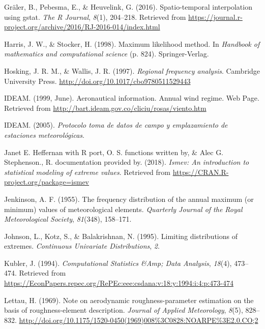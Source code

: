 \documentclass[12pt,oneside]{reedthesis}
\begin{document}
\leavevmode\hypertarget{ref-Graeler2016}{}%
Gräler, B., Pebesma, E., \& Heuvelink, G. (2016). Spatio-temporal interpolation using gstat. \emph{The R Journal}, \emph{8}(1), 204--218. Retrieved from \url{https://journal.r-project.org/archive/2016/RJ-2016-014/index.html}

\leavevmode\hypertarget{ref-Harris1994}{}%
Harris, J. W., \& Stocker, H. (1998). Maximum likelihood method. In \emph{Handbook of mathematics and computational science} (p. 824). Springer-Verlag.

\leavevmode\hypertarget{ref-Hosking1997}{}%
Hosking, J. R. M., \& Wallis, J. R. (1997). \emph{Regional frequency analysis}. Cambridge University Press. \url{http://doi.org/10.1017/cbo9780511529443}

\leavevmode\hypertarget{ref-ideam1999}{}%
IDEAM. (1999, June). Aeronautical information. Annual wind regime. Web Page. Retrieved from \url{http://bart.ideam.gov.co/cliciu/rosas/viento.htm}

\leavevmode\hypertarget{ref-ideam2005}{}%
IDEAM. (2005). \emph{Protocolo toma de datos de campo y emplazamiento de estaciones meteorológicas}.

\leavevmode\hypertarget{ref-JanetE.HeffernanwithRport2018}{}%
Janet E. Heffernan with R port, O. S. functions written by, \& Alec G. Stephenson., R. documentation provided by. (2018). \emph{Ismev: An introduction to statistical modeling of extreme values}. Retrieved from \url{https://CRAN.R-project.org/package=ismev}

\leavevmode\hypertarget{ref-Jenkinson1955}{}%
Jenkinson, A. F. (1955). The frequency distribution of the annual maximum (or minimum) values of meteorological elements. \emph{Quarterly Journal of the Royal Meteorological Society}, \emph{81}(348), 158--171.

\leavevmode\hypertarget{ref-Johnson1995}{}%
Johnson, L., Kotz, S., \& Balakrishnan, N. (1995). Limiting distributions of extremes. \emph{Continuous Univariate Distributions}, \emph{2}.

\leavevmode\hypertarget{ref-Kubler1994}{}%
Kubler, J. (1994). \emph{Computational Statistics \&Amp; Data Analysis}, \emph{18}(4), 473--474. Retrieved from \url{https://EconPapers.repec.org/RePEc:eee:csdana:v:18:y:1994:i:4:p:473-474}

\leavevmode\hypertarget{ref-Lettau1969}{}%
Lettau, H. (1969). Note on aerodynamic roughness-parameter estimation on the basis of roughness-element description. \emph{Journal of Applied Meteorology}, \emph{8}(5), 828--832. \url{http://doi.org/10.1175/1520-0450(1969)008\%3C0828:NOARPE\%3E2.0.CO;2}
\end{document}
